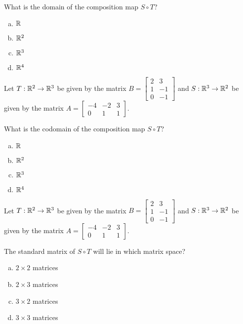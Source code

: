 \begin{applicationActivities}
\begin{activity}{2}
What is the domain of the composition map $S \circ T$?
\begin{enumerate}[(a)]
\item $\mathbb{R}$
\item $\mathbb{R}^2$
\item $\mathbb{R}^3$
\item $\mathbb{R}^4$
\end{enumerate}
\end{activity}

\begin{activity}{2}
Let $T: \mathbb{R}^2 \rightarrow \mathbb{R}^3$ be given by the matrix $B=\begin{bmatrix} 2 & 3 \\ 1 & -1 \\ 0 & -1 \end{bmatrix}$ and $S: \mathbb{R}^3 \rightarrow \mathbb{R}^2$ be given by the matrix $A=\begin{bmatrix} -4 & -2 & 3 \\ 0 & 1 & 1 \end{bmatrix}$.

What is the codomain of the composition map $S \circ T$?
\begin{enumerate}[(a)]
\item $\mathbb{R}$
\item $\mathbb{R}^2$
\item $\mathbb{R}^3$
\item $\mathbb{R}^4$
\end{enumerate}
\end{activity}

\begin{activity}{2}
Let $T: \mathbb{R}^2 \rightarrow \mathbb{R}^3$ be given by the matrix $B=\begin{bmatrix} 2 & 3 \\ 1 & -1 \\ 0 & -1 \end{bmatrix}$ and $S: \mathbb{R}^3 \rightarrow \mathbb{R}^2$ be given by the matrix $A=\begin{bmatrix} -4 & -2 & 3 \\ 0 & 1 & 1 \end{bmatrix}$.

The standard matrix of $S \circ T$ will lie in which matrix space?
\begin{enumerate}[(a)]
\item $2 \times 2$ matrices
\item $2 \times 3$ matrices
\item $3 \times 2$ matrices
\item $3 \times 3$ matrices
\end{enumerate}
\end{activity}


\end{applicationActivities}
